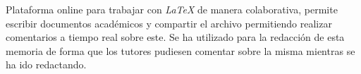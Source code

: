 Plataforma online para trabajar con \textit{LaTeX} de manera colaborativa, permite escribir documentos académicos y compartir el archivo permitiendo realizar comentarios a tiempo real sobre este. Se ha utilizado para la redacción de esta memoria de forma que los tutores pudiesen comentar sobre la misma mientras se ha ido redactando.
